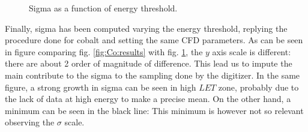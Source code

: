\documentclass[11pt,a4 paper]{article}
\begin{document}
\begin{figure}[H]
    \centering
    \caption{Sigma as a function of energy threshold.}
    \label{fig:sigma:sim}
\end{figure}



Finally, sigma has been computed varying the energy threshold, replying the procedure done for cobalt and setting the same CFD parameters. As can be seen in figure comparing fig. \ref{fig:Co:results} with fig. \ref{fig:sigma:sim}, the $y$ axis scale is different: there are about 2 order of magnitude of difference. This lead us to impute the main contribute to the sigma to the sampling done by the digitizer. In the same figure, a strong growth in sigma can be seen in high $LET$ zone, probably due to the lack of data at high energy to make a precise mean. On the other hand, a minimum can be seen in the black line: This minimum is however not so relevant observing the $\sigma$ scale.
\end{document}

